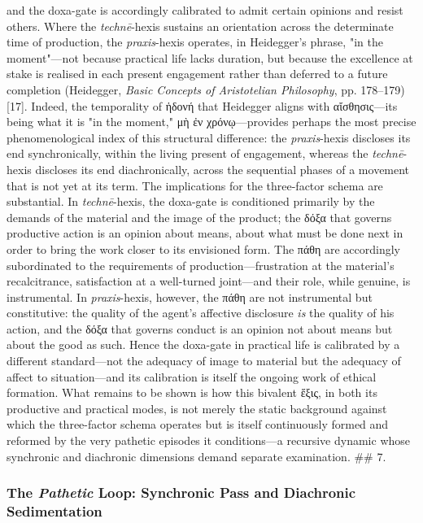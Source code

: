 \documentclass{article}
\begin{document}
and the doxa-gate is accordingly calibrated to admit certain opinions and resist others. Where the \textit{technē}-hexis sustains an orientation across the determinate time of production, the \textit{praxis}-hexis operates, in Heidegger's phrase, "in the moment"—not because practical life lacks duration, but because the excellence at stake is realised in each present engagement rather than deferred to a future completion (Heidegger, \textit{Basic Concepts of Aristotelian Philosophy}, pp. 178–179)[17]. Indeed, the temporality of ἡδονή that Heidegger aligns with αἴσθησις—its being what it is "in the moment," μὴ ἐν χρόνῳ—provides perhaps the most precise phenomenological index of this structural difference: the \textit{praxis}-hexis discloses its end synchronically, within the living present of engagement, whereas the \textit{technē}-hexis discloses its end diachronically, across the sequential phases of a movement that is not yet at its term. The implications for the three-factor schema are substantial. In \textit{technē}-hexis, the doxa-gate is conditioned primarily by the demands of the material and the image of the product; the δόξα that governs productive action is an opinion about means, about what must be done next in order to bring the work closer to its envisioned form. The πάθη are accordingly subordinated to the requirements of production—frustration at the material's recalcitrance, satisfaction at a well-turned joint—and their role, while genuine, is instrumental. In \textit{praxis}-hexis, however, the πάθη are not instrumental but constitutive: the quality of the agent's affective disclosure \textit{is} the quality of his action, and the δόξα that governs conduct is an opinion not about means but about the good as such. Hence the doxa-gate in practical life is calibrated by a different standard—not the adequacy of image to material but the adequacy of affect to situation—and its calibration is itself the ongoing work of ethical formation. What remains to be shown is how this bivalent ἕξις, in both its productive and practical modes, is not merely the static background against which the three-factor schema operates but is itself continuously formed and reformed by the very pathetic episodes it conditions—a recursive dynamic whose synchronic and diachronic dimensions demand separate examination. ## 7. 

\subsubsection*{The \textit{Pathetic} Loop: Synchronic Pass and Diachronic Sedimentation}
\end{document}
